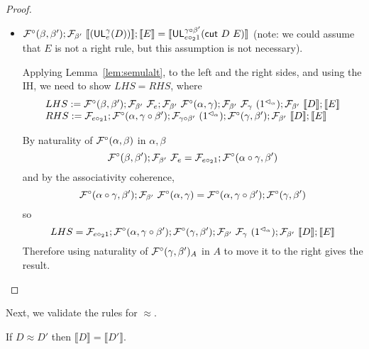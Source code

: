 \documentclass{drl-common/llncs}
\renewcommand{\sem}[1]{\ensuremath{ \llbracket #1 \rrbracket}}
\newcommand\compo[2]{\ensuremath{#1 \circ #2}}
\newcommand\comph[2]{\ensuremath{#1 \mathbin{\circ_2} #2}}
\newcommand\cutsym{\ensuremath{\dsd{cut}}}
\newcommand\cut[2]{\ensuremath{{\cutsym \,\, #1 \,\, #2}}}
\newcommand\UL[3]{\ensuremath{\dsd{UL}^{#1}_{#2}(#3)}}
\newcommand\ap[2]{\ensuremath{#1 \approx #2}}
\begin{document}
\begin{proof}
\begin{itemize}
\item $\semofcut {(\UL \gamma e D)} E = \sem{\UL {\compo{\gamma}{\beta'}}
  {\comph{e}{1}} {\cut D E}}$ (note: we could assume that $E$ is not a
  right rule, but this assumption is not necessary).  

Applying Lemma~\ref{lem:semulalt}, to the left and the right sides, and
using the IH, we need to show $LHS = RHS$, where
\[
\begin{array}{l}
LHS :=
\semFcomp(\beta,\beta');\semF{\beta'}{\semFo{e}};\semF{\beta'}{\semFcomp(\alpha,\gamma)};\semF{\beta'}{\semF{\gamma}{(\semrtol
    1 \alpha)}};\semF{\beta'}{\sem D};\sem{E}\\
RHS :=
\semFo{\comph{e}{1}};\semFcomp(\alpha,\compo{\gamma}{\beta'});\semF{\compo{\gamma}{\beta'}}{(\semrtol{1}{\alpha})};\semFcomp(\gamma,\beta');\semF{\beta'}{\sem D};\sem{E}
\end{array}
\]

By naturality of $\mathcal{F}^\circ(\alpha,\beta)$ in $\alpha,\beta$
\[
\semFcomp(\beta,\beta');\semF{\beta'}{\semFo{e}} = \semFo{\comph{e}{1}};\semFcomp(\compo{\alpha}{\gamma},\beta')
\]
and by the associativity coherence, 
\[
\semFcomp(\compo{\alpha}{\gamma},\beta');\semF{\beta'}{\semFcomp(\alpha,\gamma)}
= 
\semFcomp(\alpha,\compo{\gamma}{\beta'});\semFcomp(\gamma,\beta')
\]
so 
\[
LHS = 
\semFo{\comph{e}{1}};
\semFcomp(\alpha,\compo{\gamma}{\beta'});\semFcomp(\gamma,\beta')
;\semF{\beta'}{\semF{\gamma}{(\semrtol
    1 \alpha)}};\semF{\beta'}{\sem D};\sem{E}
\]
Therefore using naturality of $\mathcal{F}^\circ(\gamma,\beta')_A$ in $A$ to
move it to the right gives the result. 
\end{itemize}
\end{proof}

Next, we validate the rules for \ap{}{}.  

\begin{theorem} \label{thm:semeq}
If \ap{D}{D'} then $\sem{D} = \sem{D'}$.  
\end{theorem}
\end{document}
